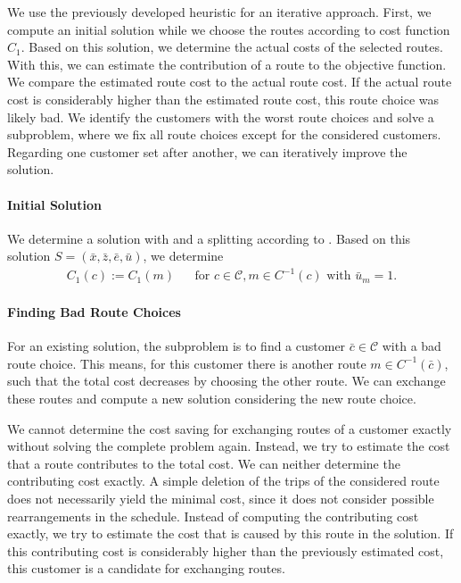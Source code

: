 We use the previously developed heuristic for an iterative approach. First, we compute an initial solution while we choose the routes according to cost function $C_1$. Based on this solution, we determine the actual costs of the selected routes. With this, we can estimate the contribution of a route to the objective function. We compare the estimated route cost to the actual route cost. If the actual route cost is considerably higher than the estimated route cost, this route choice was likely bad. We identify the customers with the worst route choices and solve a subproblem, where we fix all route choices except for the considered customers. Regarding one customer set after another, we can iteratively improve the solution.

\paragraph{Initial Solution} \parfill

We determine a solution with  and a splitting according to . Based on this solution $S=\left(\bar{x},\bar{z},\bar{e},\bar{u}\right)$, we determine 
\begin{align*}
	C_1(c) := C_1(m) && \text{for } c\in\mathcal{C}, m\in C^{-1}(c) \text{ with } \bar{u}_m = 1.
\end{align*}

\paragraph{Finding Bad Route Choices} \parfill

For an existing solution, the subproblem is to find a customer ${\bar{c}\in\mathcal{C}}$ with a bad route choice. This means, for this customer there is another route ${m\in C^{-1}\left(\bar{c}\right)}$, such that the total cost decreases by choosing the other route. We can exchange these routes and compute a new solution considering the new route choice. 

We cannot determine the cost saving for exchanging routes of a customer exactly without solving the complete problem again. Instead, we try to estimate the cost that a route contributes to the total cost. We can neither determine the contributing cost exactly. A simple deletion of the trips of the considered route does not necessarily yield the minimal cost, since it does not consider possible rearrangements in the schedule. Instead of computing the contributing cost exactly, we try to estimate the cost that is caused by this route in the solution. If this contributing cost is considerably higher than the previously estimated cost, this customer is a candidate for exchanging routes.

